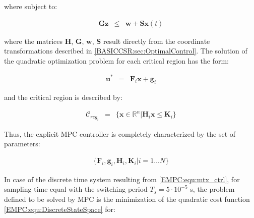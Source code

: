     where subject to:

    \begin{equation}
        \begin{array}{rcl}
            \textbf{Gz}&\leq&\textbf{w}+\textbf{S}\textbf{x}(t)
        \end{array}
        \label{EMPC:equ:quadratic_inequality}
    \end{equation}

    where the matrices $\textbf{H}$, $\textbf{G}$, $\textbf{w}$, $\textbf{S}$ result directly from the coordinate transformations described in \ref{BASICCSR:sec:OptimalControl}. The solution of the quadratic optimization problem for each critical region has the form:

    \begin{equation}
        \begin{array}{rcl}
            \textbf{u}^*&=&\textbf{F}_i\textbf{x}+\textbf{g}_i
        \end{array}
        \label{EMPC:equ:quadratic_regions}
    \end{equation}

    and the critical region is described by:

    \begin{equation}
        \begin{array}{rcl}
            \mathcal{C}_{reg_i}&=&\{\textbf{x}\in \mathbb{R}^n|\textbf{H}_i\textbf{x}\leq \textbf{K}_i\}
        \end{array}
        \label{EMPC:equ:quadratic_critical}
    \end{equation}

    Thus, the explicit MPC controller is completely characterized by the set of parameters:

    \begin{equation}
        \begin{array}{l}
            \{\textbf{F}_i,\textbf{g}_i,\textbf{H}_i,\textbf{K}_i|i=1\dots N\}
        \end{array}
        \label{EMPC:equ:quadratic_set}
    \end{equation}

    In case of the discrete time system resulting from \ref{EMPC:equ:mtx_ctrl}, for sampling time equal with the switching period $T_s=5\cdot10^{-5}$  s, the problem defined to be solved by MPC is the minimization of the quadratic cost function \ref{EMPC:equ:DiscreteStateSpace} for:

